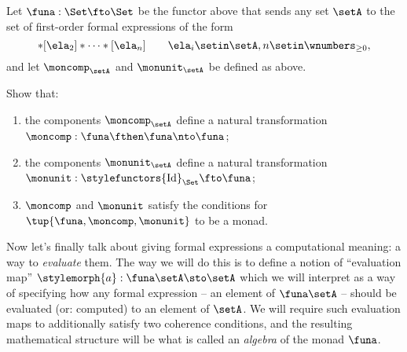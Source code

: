 \begin{gradedexercise}
    \label{ex:ListMonad}
    Let $\funa : \Set \fto \Set$ be the functor above that sends any set $\setA$ to the set of first-order formal expressions of the form
    \begin{equation}
        [\ela_1]
        * [\ela_2] * \cdots * [\ela_n] \quad \quad \ela_i \setin \setA, n \setin \wnumbers_{\geq 0},
    \end{equation}
    and let $\moncomp_\setA$ and $\monunit_\setA$ be defined as above.

    Show that:
    \begin{enumerate}
        \item the components $\moncomp_\setA$ define a natural transformation $\moncomp : \funa \fthen \funa \nto \funa$;
        \item the components $\monunit_\setA$ define a natural transformation $\monunit : \stylefunctors{\text{Id}}_{\Set} \fto \funa$;
        \item $\moncomp$ and $\monunit$ satisfy the conditions for $\tup{\funa, \moncomp, \monunit}$ to be a monad.
    \end{enumerate}
\end{gradedexercise}


Now let's finally talk about giving formal expressions a computational meaning: a way to \emph{evaluate} them.
The way we will do this is to define a notion of ``evaluation map'' $\stylemorph{a}: \funa \setA \sto \setA$ which we will interpret as a way of specifying how any formal expression -- an element of $\funa \setA$ -- should be evaluated (or: computed) to an element of $\setA$.
We will require such evaluation maps to additionally satisfy two coherence conditions, and the resulting mathematical structure will be what is called an \emph{algebra} of the monad $\funa$.


